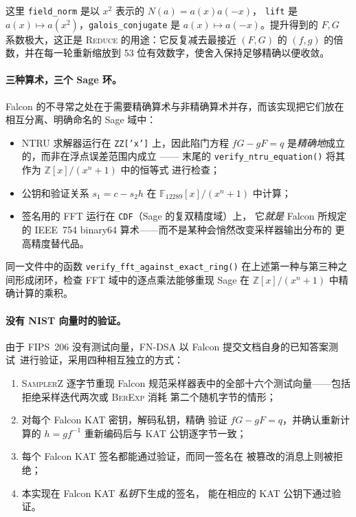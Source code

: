 这里 \texttt{field\_norm} 是以 $x^2$ 表示的 $N(a) = a(x)a(-x)$，
\texttt{lift} 是 $a(x)\mapsto a(x^2)$，\texttt{galois\_conjugate} 是
$a(x)\mapsto a(-x)$。提升得到的 $F,G$ 系数极大，这正是 \textsc{Reduce} 的用途：它反复减去最接近 $(F,G)$ 的
$(f,g)$ 的倍数，并在每一轮重新缩放到 53 位有效数字，使舍入保持足够精确以便收敛。

\paragraph{三种算术，三个 Sage 环。}
Falcon 的不寻常之处在于需要精确算术与非精确算术并存，而该实现把它们放在相互分离、明确命名的 Sage 域中：

\begin{itemize}
  \item NTRU 求解器运行在 \texttt{ZZ['x']} 上，因此陷门方程
        $fG-gF=q$ 是\emph{精确地}成立的，而非在浮点误差范围内成立
        —— 末尾的 \texttt{verify\_ntru\_equation()}
        将其作为 $\mathbb{Z}[x]/(x^n+1)$ 中的恒等式
        进行检查；
  \item 公钥和验证关系
        $s_1 = c - s_2 h$ 在
        $\mathbb{F}_{12289}[x]/(x^n+1)$ 中计算；
  \item 签名用的 FFT 运行在 \texttt{CDF}（Sage 的复双精度域）上，
        它\emph{就是} Falcon 所规定的 IEEE~754 binary64
        算术——而不是某种会悄然改变采样器输出分布的
        更高精度替代品。
\end{itemize}

同一文件中的函数 \texttt{verify\_fft\_against\_exact\_ring()}
在上述第一种与第三种之间形成闭环，检查 FFT 域中的逐点乘法能够重现 Sage 在
$\mathbb{Z}[x]/(x^n+1)$ 中精确计算的乘积。

\paragraph{没有 NIST 向量时的验证。}
由于 FIPS~206 没有测试向量，FN-DSA 以 Falcon
提交文档自身的已知答案测试~\cite{falcon2020}进行验证，采用四种相互独立的方式：

\begin{enumerate}
  \item \textsc{SamplerZ} 逐字节重现 Falcon
        规范采样器表中的全部十六个测试向量——包括
        拒绝采样迭代两次或 \textsc{BerExp} 消耗
        第二个随机字节的情形；
  \item 对每个 Falcon KAT 密钥，解码私钥，精确
        验证 $fG-gF=q$，并确认重新计算的 $h=g f^{-1}$ 重新编码后与
        KAT 公钥逐字节一致；
  \item 每个 Falcon KAT 签名都能通过验证，而同一签名在
        被篡改的消息上则被拒绝；
  \item 本实现在 Falcon KAT \emph{私钥}下生成的签名，
        能在相应的 KAT 公钥下通过验证。
\end{enumerate}

